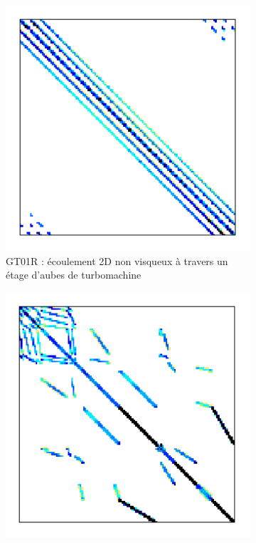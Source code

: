 		\begin{figure}
			\centering
			\begin{subfigure}[t]{0.3\textwidth}
				\centering
				\includegraphics[width=\textwidth]{images/GT01R.png}
				\caption{GT01R : écoulement 2D non visqueux à travers un étage d'aubes de turbomachine}
				\label{fig:sparse.GT01R}
			\end{subfigure}
			\hfill
			\begin{subfigure}[t]{0.3\textwidth}
				\centering
				\includegraphics[width=\textwidth]{images/HV15R.png}

\end{subfigure}
\end{figure}
